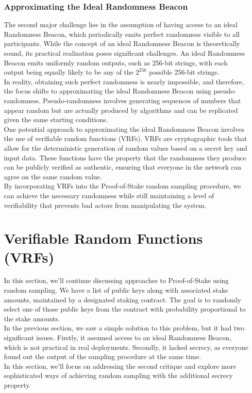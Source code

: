 \subsubsection{Approximating the Ideal Randomness Beacon}
The second major challenge lies in the assumption of having access to an ideal Randomness Beacon, which periodically emits perfect randomness visible to all participants. While the concept of an ideal Randomness Beacon is theoretically sound, its practical realization poses significant challenges. An ideal Randomness Beacon emits uniformly random outputs, such as 256-bit strings, with each output being equally likely to be any of the $2^{256}$ possible 256-bit strings.\\
In reality, obtaining such perfect randomness is nearly impossible, and therefore, the focus shifts to approximating the ideal Randomness Beacon using pseudo-randomness. Pseudo-randomness involves generating sequences of numbers that appear random but are actually produced by algorithms and can be replicated given the same starting conditions.\\
One potential approach to approximating the ideal Randomness Beacon involves the use of verifiable random functions (VRFs). VRFs are cryptographic tools that allow for the deterministic generation of random values based on a secret key and input data. These functions have the property that the randomness they produce can be publicly verified as authentic, ensuring that everyone in the network can agree on the same random value.\\
By incorporating VRFs into the Proof-of-Stake random sampling procedure, we can achieve the necessary randomness while still maintaining a level of verifiability that prevents bad actors from manipulating the system.

\section{Verifiable Random Functions (VRFs)}
In this section, we'll continue discussing approaches to Proof-of-Stake using random sampling. We have a list of public keys along with associated stake amounts, maintained by a designated staking contract. The goal is to randomly select one of those public keys from the contract with probability proportional to the stake amounts.\\
In the previous section, we saw a simple solution to this problem, but it had two significant issues. Firstly, it assumed access to an ideal Randomness Beacon, which is not practical in real deployments. Secondly, it lacked secrecy, as everyone found out the output of the sampling procedure at the same time.\\
In this section, we'll focus on addressing the second critique and explore more sophisticated ways of achieving random sampling with the additional secrecy property.


